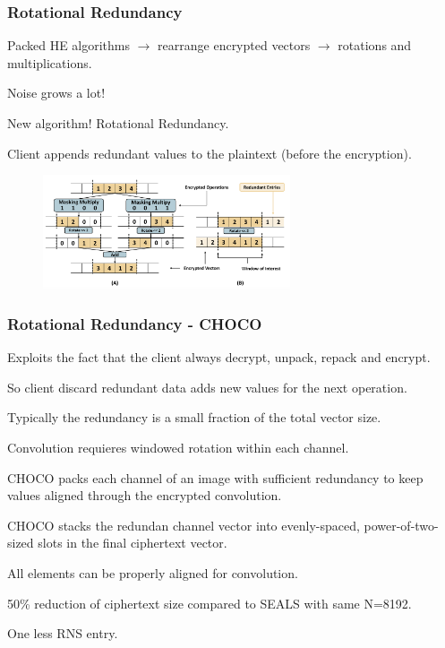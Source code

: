 \documentclass[10pt,handout]{beamer}
\begin{document}


\begin{frame}
\frametitle{Rotational Redundancy}

Packed HE algorithms $\rightarrow$  rearrange encrypted vectors $\rightarrow$ rotations and multiplications.

Noise grows a lot!



New algorithm! Rotational Redundancy.

    Client appends redundant values to the plaintext (before the encryption).
\begin{figure}
    \includegraphics[width=0.65\textwidth]{rotation.png}
\end{figure}



\end{frame}



\begin{frame}
\frametitle{Rotational Redundancy - CHOCO}
Exploits the fact that the client  always decrypt, unpack, repack and encrypt.

So client discard redundant data adds new values for the next operation.

Typically the redundancy is a small fraction of the total vector size.

Convolution requieres windowed rotation within each channel.

CHOCO packs each channel of an image with sufficient redundancy to keep
values aligned through the encrypted convolution.

CHOCO stacks the redundan channel vector into evenly-spaced, power-of-two-sized slots in the final ciphertext vector.

All elements can be properly aligned for convolution.

50\% reduction of ciphertext size compared to SEALS with same N=8192.

One less  RNS entry.
\end{frame}
\end{document}
